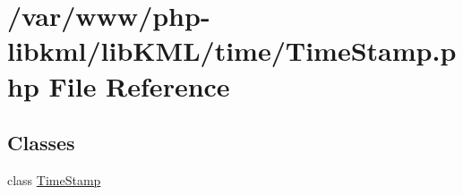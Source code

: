\hypertarget{TimeStamp_8php}{
\section{/var/www/php-\/libkml/libKML/time/TimeStamp.php File Reference}
\label{da/d88/TimeStamp_8php}
}
\subsection*{Classes}
\begin{DoxyCompactItemize}
\item 
class \hyperlink{classTimeStamp}{TimeStamp}
\end{DoxyCompactItemize}
